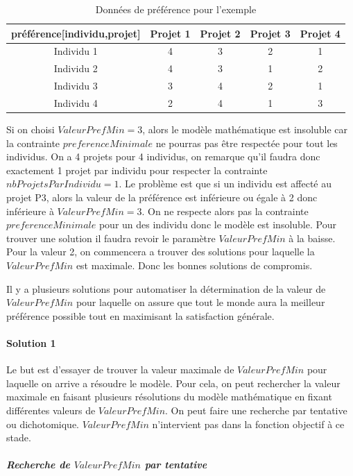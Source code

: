 \documentclass{polytech/polytech}
\begin{document}
\begin{table}
\caption{\label{tab:preference_exemple}Données de préférence pour l'exemple}
\begin{tabular}{|c|c|c|c|c|}
\hline
préférence[individu,projet] & Projet 1 & Projet 2 & Projet 3 & Projet 4 \\
\hline
Individu 1 & 4 & 3 & 2 & 1 \\
\hline
Individu 2 & 4 & 3 & 1 & 2 \\
\hline
Individu 3 & 3 & 4 & 2 & 1 \\
\hline
Individu 4 & 2 & 4 & 1 & 3 \\
\hline
\end{tabular}
\end{table}

Si on choisi $ValeurPrefMin=3$, alors le modèle mathématique est insoluble car la contrainte $preferenceMinimale$ ne pourras pas être respectée pour tout les individus. On a 4 projets pour 4 individus, on remarque qu'il faudra donc exactement 1 projet par individu pour respecter la contrainte $nbProjetsParIndividu=1$. Le problème est que si un individu est affecté au projet P3, alors la valeur de la préférence est inférieure ou égale à 2 donc inférieure à $ValeurPrefMin=3$. On ne respecte alors pas la contrainte $preferenceMinimale$ pour un des individu donc le modèle est insoluble.
Pour trouver une solution il faudra revoir le paramètre $ValeurPrefMin$ à la baisse. Pour la valeur 2, on commencera a trouver des solutions pour laquelle la $ValeurPrefMin$ est maximale. Donc les bonnes solutions de compromis.

Il y a plusieurs solutions pour automatiser la détermination de la valeur de $ValeurPrefMin$ pour laquelle on assure que tout le monde aura la meilleur préférence possible tout en maximisant la satisfaction générale.

\paragraph{Solution 1}
Le but est d'essayer de trouver la valeur maximale de $ValeurPrefMin$ pour laquelle on arrive a résoudre le modèle. Pour cela, on peut rechercher la valeur maximale en faisant plusieurs résolutions du modèle mathématique en fixant différentes valeurs de $ValeurPrefMin$. On peut faire une recherche par tentative ou dichotomique. $ValeurPrefMin$ n'intervient pas dans la fonction objectif à ce stade.

\subparagraph{Recherche de $ValeurPrefMin$ par tentative}
\end{document}
